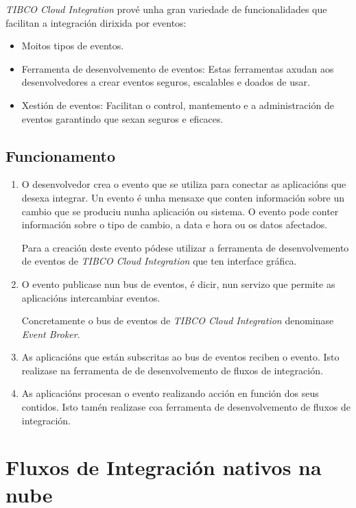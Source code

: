 \textit{TIBCO Cloud Integration} prové unha gran variedade de funcionalidades que facilitan a integración dirixida por eventos:

\begin{itemize}
    \item Moitos tipos de eventos.
    \item Ferramenta de desenvolvemento de eventos: Estas ferramentas axudan aos desenvolvedores a crear eventos seguros, escalables e doados de usar.
    \item Xestión de eventos: Facilitan o control, mantemento e a administración de eventos garantindo que sexan seguros e eficaces.
\end{itemize}

\subsection{Funcionamento}

\begin{enumerate}
    \item O desenvolvedor crea o evento que se utiliza para conectar as aplicacións que desexa integrar. Un evento é unha mensaxe que conten información sobre un cambio que se produciu nunha aplicación ou sistema. O evento pode conter información sobre o tipo de cambio, a data e hora ou os datos afectados.
    
    Para a creación deste evento pódese utilizar a ferramenta de desenvolvemento de eventos de \textit{TIBCO Cloud Integration} que ten interface gráfica.
    
    \item O evento publicase nun bus de eventos, é dicir, nun servizo que permite as aplicacións intercambiar eventos.
    
    Concretamente o bus de eventos de \textit{TIBCO Cloud Integration} denominase \textit{Event Broker}.
    
    \item As aplicacións que están subscritas ao bus de eventos reciben o evento. Isto realizase na ferramenta de de desenvolvemento de fluxos de integración.
    
    \item As aplicacións procesan o evento realizando acción en función dos seus contidos. Isto tamén realizase coa ferramenta de desenvolvemento de fluxos de integración.
\end{enumerate}

\section{Fluxos de Integración nativos na nube}

